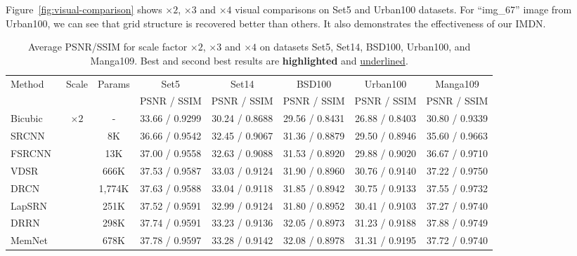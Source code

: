 \documentclass[sigconf]{acmart}
\begin{document}
Figure~\ref{fig:visual-comparison} shows $\times 2$, $\times 3$ and $\times 4$ visual comparisons on Set5 and Urban100 datasets. For ``img\_67'' image from Urban100, we can see that grid structure is recovered better than others. It also demonstrates the effectiveness of our IMDN.
\begin{table*}[htpb]
	\caption{Average PSNR/SSIM for scale factor $\times 2$, $\times 3$ and $\times 4$ on datasets Set5, Set14, BSD100, Urban100, and Manga109. Best and second best results are \textbf{highlighted} and \underline{underlined}.}
	\centering
	\begin{tabular}{|l|c|c|c|c|c|c|c|}
		\hline
		\multirow{2}{*}{Method} & \multirow{2}{*}{Scale} & \multirow{2}{*}{Params} & Set5 & Set14 & BSD100 & Urban100 & Manga109 \\
		\cline{4-8}
		& & & PSNR / SSIM & PSNR / SSIM & PSNR / SSIM & PSNR / SSIM & PSNR / SSIM \\
		\hline
		\hline
Bicubic & \multirow{13}{*}{$\times 2$} & - &33.66 / 0.9299 & 30.24 / 0.8688 & 29.56 / 0.8431 & 26.88 / 0.8403 & 30.80 / 0.9339 \\
		
		SRCNN~\cite{SRCNN} & & 8K & 36.66 / 0.9542 & 32.45 / 0.9067 & 31.36 / 0.8879 & 29.50 / 0.8946 & 35.60 / 0.9663 \\
		
		FSRCNN~\cite{FSRCNN} & & 13K & 37.00 / 0.9558 & 32.63 / 0.9088 & 31.53 / 0.8920 & 29.88 / 0.9020 & 36.67 / 0.9710 \\
		
		VDSR~\cite{VDSR} & & 666K & 37.53 / 0.9587 & 33.03 / 0.9124 & 31.90 / 0.8960 & 30.76 / 0.9140 & 37.22 / 0.9750 \\
		
		DRCN~\cite{DRCN} &  & 1,774K & 37.63 / 0.9588 & 33.04 / 0.9118 & 31.85 / 0.8942 & 30.75 / 0.9133 & 37.55 / 0.9732 \\
		
		LapSRN~\cite{LapSRN} &  & 251K & 37.52 / 0.9591 & 32.99 / 0.9124 & 31.80 / 0.8952 & 30.41 / 0.9103 & 37.27 / 0.9740 \\
		
		DRRN~\cite{DRRN} &  & 298K & 37.74 / 0.9591 & 33.23 / 0.9136 & 32.05 / 0.8973 & 31.23 / 0.9188 & 37.88 / 0.9749 \\
		
		MemNet~\cite{MemNet} &  & 678K & 37.78 / 0.9597 & 33.28 / 0.9142 & 32.08 / 0.8978 & 31.31 / 0.9195 & 37.72 / 0.9740 \\
		

\end{tabular}
\end{table*}
\end{document}
